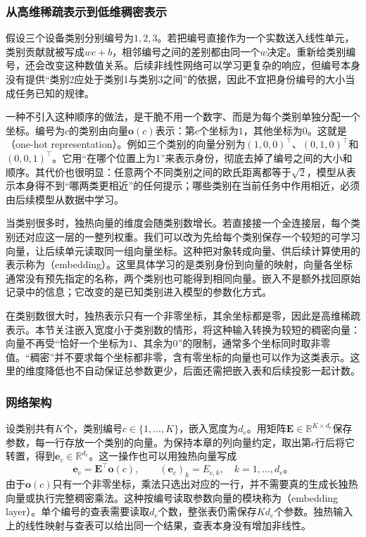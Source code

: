 \subsubsection{从高维稀疏表示到低维稠密表示}
\label{sec:ffn-embedding-motivation}

假设三个设备类别分别编号为$1,2,3$。若把编号直接作为一个实数送入线性单元，类别贡献就被写成$wc+b$，相邻编号之间的差别都由同一个$w$决定。重新给类别编号，还会改变这种数值关系。后续非线性网络可以学习更复杂的响应，但编号本身没有提供“类别2应处于类别1与类别3之间”的依据，因此不宜把身份编号的大小当成任务已知的规律。

一种不引入这种顺序的做法，是干脆不用一个数字、而是为每个类别单独分配一个坐标。编号为$c$的类别由向量$\bm{o}(c)$表示：第$c$个坐标为$1$，其他坐标为$0$。这就是（one-hot representation）。例如三个类别的向量分别为$(1,0,0)^{\top}$、$(0,1,0)^{\top}$和$(0,0,1)^{\top}$。它用“在哪个位置上为1”来表示身份，彻底去掉了编号之间的大小和顺序。其代价也很明显：任意两个不同类别之间的欧氏距离都等于$\sqrt{2}$，模型从表示本身得不到“哪两类更相近”的任何提示；哪些类别在当前任务中作用相近，必须由后续模型从数据中学习。

当类别很多时，独热向量的维度会随类别数增长。若直接接一个全连接层，每个类别还对应这一层的一整列权重。我们可以改为先给每个类别保存一个较短的可学习向量，让后续单元读取同一组向量坐标。这种把对象转成向量、供后续计算使用的表示称为（embedding）。这里具体学习的是类别身份到向量的映射，向量各坐标通常没有预先指定的名称，两个类别也可能得到相同向量。嵌入不是额外找回原始记录中的信息；它改变的是已知类别进入模型的参数化方式。

在类别数很大时，独热表示只有一个非零坐标，其余坐标都是零，因此是高维稀疏表示。本节关注嵌入宽度小于类别数的情形，将这种输入转换为较短的稠密向量：向量不再受“恰好一个坐标为$1$、其余为$0$”的限制，通常多个坐标同时取非零值。“稠密”并不要求每个坐标都非零，含有零坐标的向量也可以作为这类表示。这里的维度降低也不自动保证总参数更少，后面还需把嵌入表和后续投影一起计数。

\subsubsection{网络架构}
\label{sec:ffn-embedding-architecture}

设类别共有$K$个，类别编号$c\in\{1,\ldots,K\}$，嵌入宽度为$d_e$。用矩阵$\bm{E}\in\mathbb{R}^{K\times d_e}$保存参数，每一行存放一个类别的向量。为保持本章的列向量约定，取出第$c$行后将它转置，得到$\bm{e}_c\in\mathbb{R}^{d_e}$。这一操作也可以用独热向量写成
\begin{equation}
  \bm{e}_c=\bm{E}^{\top}\bm{o}(c),
  \qquad (\bm{e}_c)_k=E_{c,k},\quad k=1,\ldots,d_e\text{。}
  \label{eq:ffn-embedding-lookup}
\end{equation}
由于$\bm{o}(c)$只有一个非零坐标，乘法只选出对应的一行，并不需要真的生成长独热向量或执行完整稠密乘法。这种按编号读取参数向量的模块称为（embedding layer）。单个编号的查表需要读取$d_e$个数，整张表仍需保存$Kd_e$个参数。独热输入上的线性映射与查表可以给出同一个结果，查表本身没有增加非线性。

